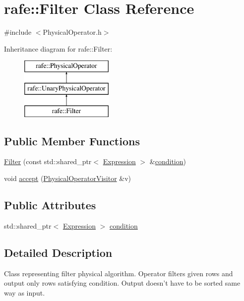\hypertarget{classrafe_1_1_filter}{\section{rafe\+:\+:Filter Class Reference}
\label{classrafe_1_1_filter}
}


{\ttfamily \#include $<$Physical\+Operator.\+h$>$}

Inheritance diagram for rafe\+:\+:Filter\+:\begin{figure}[H]
\begin{center}
\leavevmode
\includegraphics[height=3.000000cm]{classrafe_1_1_filter}
\end{center}
\end{figure}
\subsection*{Public Member Functions}
\begin{DoxyCompactItemize}
\item 
\hyperlink{classrafe_1_1_filter_af4f33192eef0626cf16fc9cb51b3e3de}{Filter} (const std\+::shared\+\_\+ptr$<$ \hyperlink{classrafe_1_1_expression}{Expression} $>$ \&\hyperlink{classrafe_1_1_filter_ac57844e611bd2d1951d1d4089135ddb9}{condition})
\item 
void \hyperlink{classrafe_1_1_filter_a27d15fd98afe3c03f05f5a4c5846b2a6}{accept} (\hyperlink{classrafe_1_1_physical_operator_visitor}{Physical\+Operator\+Visitor} \&v)
\end{DoxyCompactItemize}
\subsection*{Public Attributes}
\begin{DoxyCompactItemize}
\item 
std\+::shared\+\_\+ptr$<$ \hyperlink{classrafe_1_1_expression}{Expression} $>$ \hyperlink{classrafe_1_1_filter_ac57844e611bd2d1951d1d4089135ddb9}{condition}
\end{DoxyCompactItemize}


\subsection{Detailed Description}
Class representing filter physical algorithm. Operator filters given rows and output only rows satisfying condition. Output doesn't have to be sorted same way as input. 

